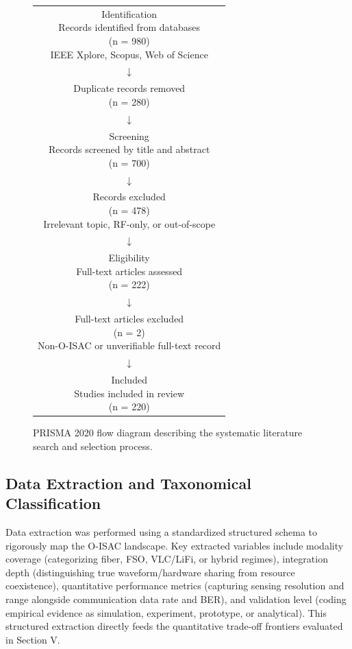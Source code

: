 \begin{figure}[htbp]
\centering
\setlength{\tabcolsep}{4pt}
\renewcommand{\arraystretch}{1.15}
\begin{tabular}{c}
\fbox{\parbox{0.92\linewidth}{\centering Identification\\Records identified from databases\\(n = 980)\\IEEE Xplore, Scopus, Web of Science}} \\
$\downarrow$ \\
\fbox{\parbox{0.92\linewidth}{\centering Duplicate records removed\\(n = 280)}} \\
$\downarrow$ \\
\fbox{\parbox{0.92\linewidth}{\centering Screening\\Records screened by title and abstract\\(n = 700)}} \\
$\downarrow$ \\
\fbox{\parbox{0.92\linewidth}{\centering Records excluded\\(n = 478)\\Irrelevant topic, RF-only, or out-of-scope}} \\
$\downarrow$ \\
\fbox{\parbox{0.92\linewidth}{\centering Eligibility\\Full-text articles assessed\\(n = 222)}} \\
$\downarrow$ \\
\fbox{\parbox{0.92\linewidth}{\centering Full-text articles excluded\\(n = 2)\\Non-O-ISAC or unverifiable full-text record}} \\
$\downarrow$ \\
\fbox{\parbox{0.92\linewidth}{\centering Included\\Studies included in review\\(n = 220)}}
\end{tabular}
\caption{PRISMA 2020 flow diagram describing the systematic literature search and selection process.}
\label{fig:fig_iii_1}
\end{figure}

\FloatBarrier

\subsection{Data Extraction and Taxonomical Classification}
Data extraction was performed using a standardized structured schema to rigorously map the O-ISAC landscape. Key extracted variables include modality coverage (categorizing fiber, FSO, VLC/LiFi, or hybrid regimes), integration depth (distinguishing true waveform/hardware sharing from resource coexistence), quantitative performance metrics (capturing sensing resolution and range alongside communication data rate and BER), and validation level (coding empirical evidence as simulation, experiment, prototype, or analytical). This structured extraction directly feeds the quantitative trade-off frontiers evaluated in Section V.


